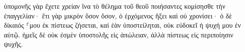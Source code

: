 \documentclass{openreader}
\begin{document}
ὑπομονῆς γὰρ ἔχετε χρείαν ἵνα τὸ θέλημα τοῦ θεοῦ ποιήσαντες κομίσησθε τὴν ἐπαγγελίαν· 
ἔτι γὰρ μικρὸν ὅσον ὅσον, ὁ ἐρχόμενος ἥξει καὶ οὐ χρονίσει· 
ὁ δὲ δίκαιός ⸀μου ἐκ πίστεως ζήσεται, καὶ ἐὰν ὑποστείληται, οὐκ εὐδοκεῖ ἡ ψυχή μου ἐν αὐτῷ. 
ἡμεῖς δὲ οὐκ ἐσμὲν ὑποστολῆς εἰς ἀπώλειαν, ἀλλὰ πίστεως εἰς περιποίησιν ψυχῆς. 
\end{document}
